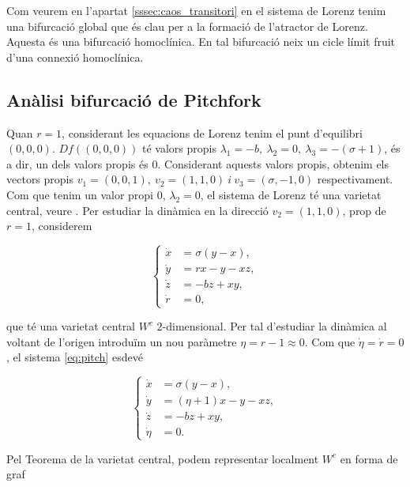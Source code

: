 \documentclass[11pt,a4paper,openright,oneside]{article}
\numberwithin{equation}{section}
\theoremstyle{definition}
\begin{document}
Com veurem en l'apartat \ref{sssec:caos_transitori} en el sistema de Lorenz tenim una bifurcació global que és clau per a la formació de l'atractor de Lorenz. Aquesta és una bifurcació homoclínica. En tal bifurcació neix un cicle límit fruit d'una connexió homoclínica.

\subsection{Anàlisi bifurcació de Pitchfork}\label{sssec:Pitchfork}

Quan $r=1$, considerant les equacions de Lorenz tenim el punt d'equilibri $(0,0,0)$. $Df\left((0,0,0)\right)$ té valors propis $\lambda_1=-b, \ \lambda_2=0, \ \lambda_3=-(\sigma+1)$, és a dir, un dels valors propis és $0$. Considerant aquests valors propis, obtenim els vectors propis $v_1=(0,0,1), \ v_2=(1,1,0) \ i \ v_3=(\sigma, -1, 0)$ respectivament. Com que tenim un valor propi $0$, $\lambda_2=0$, el sistema de Lorenz té una varietat central, veure \cite{Guck}. Per estudiar la dinàmica en la direcció $v_2=(1,1,0)$, prop de $r=1$, considerem 

\begin{equation} \label{eq:pitch}
    \left\{ \begin{aligned} 
            \dot{x} &= \sigma(y-x), \\
            \dot{y} &= rx-y-xz, \\
            \dot{z} &=-bz+xy, \\
            \dot{r} &= 0,
        \end{aligned} \right.    
\end{equation}

que té una varietat central $W^c$ $2$-dimensional. Per tal d'estudiar la dinàmica al voltant de l'origen introduïm un nou paràmetre $\eta=r-1\approx 0$. Com que $\dot{\eta}=\dot{r}=0$, el sistema \eqref{eq:pitch} esdevé

\begin{equation} \label{eq:pitch_2}
    \left\{ \begin{aligned} 
            \dot{x} &= \sigma(y-x), \\
            \dot{y} &= (\eta+1)x-y-xz, \\
            \dot{z} &=-bz+xy, \\
            \dot{\eta} &= 0.
        \end{aligned} \right.    
\end{equation}

Pel Teorema de la varietat central, podem representar localment $W^c$ en forma de graf
\end{document}
